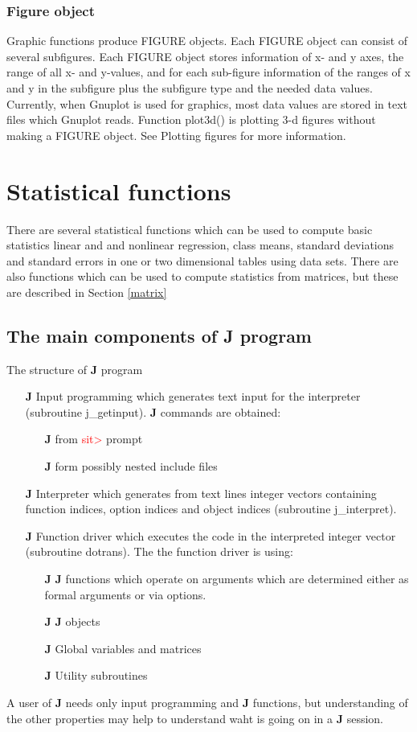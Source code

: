 \subsubsection{Figure object}
\label{figureo}
Graphic functions produce FIGURE objects. Each FIGURE object can consist of
several subfigures. Each FIGURE object stores information of x- and y axes, the
range of all x- and y-values, and for each sub-figure information of the ranges
of x and y in the subfigure plus the subfigure type and the needed data values.
Currently, when Gnuplot is used for graphics, most data values are stored
in text files which Gnuplot reads. Function \textcolor{VioletRed}{plot3d}() is plotting 3-d figures without making a FIGURE object.
See Plotting figures for more information.
\section{Statistical functions}
\label{statistics}
There are several statistical functions which can be used to compute basic statistics
linear and and nonlinear regression, class means, standard deviations and standard errors
in one or two dimensional tables using data sets. There are also functions
which can be used to compute statistics from matrices, but these are described
in Section  \ref{matrix}
\subsection{The main components of \textbf{J} program}
\label{compo}
The structure of \textbf{J} program
\begin{itemize}
\item[\textbf{J}] Input programming which generates text input for the interpreter (subroutine
j\_getinput). \textbf{J} commands are obtained:
\begin{itemize}
\item[\textbf{J}] from \textcolor{Red}{sit>} prompt
\item[\textbf{J}] form possibly nested include files
\end{itemize}
\item[\textbf{J}] Interpreter which generates from text lines integer vectors containing function indices,
option indices and object indices (subroutine j\_interpret).
\item[\textbf{J}] Function driver which executes the code in the interpreted integer vector
(subroutine dotrans). The the function driver is using:
\begin{itemize}
\item[\textbf{J}] \textbf{J} functions which operate on arguments which are determined either as formal arguments or
via options.
\item[\textbf{J}] \textbf{J} objects
\item[\textbf{J}] Global variables and matrices
\item[\textbf{J}] Utility subroutines
\end{itemize}
\end{itemize}
A user of \textbf{J} needs only input programming and \textbf{J} functions, but understanding of
the other properties may help to understand waht is going on in a \textbf{J} session.
